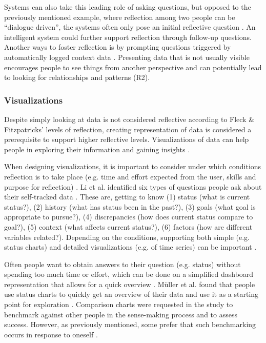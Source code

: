 Systems can also take this leading role of asking questions, but opposed to the previously mentioned example, where reflection among two people can be “dialogue driven”, the systems often only pose  an initial reflective question \cite{Mols}. An intelligent system could further support reflection through follow-up questions. Another ways to foster reflection is by prompting questions triggered by automatically logged context data \cite{Fleck}. Presenting data that is not usually visible encourages people to see things from another perspective and can potentially lead to looking for relationships and patterns (R2). 

\subsubsection{Visualizations}
Despite simply looking at data is not considered reflective according to Fleck \& Fitzpatricks’ levels of reflection, creating representation of data is considered a prerequisite to support higher reflective levels. Visualizations of data can help people in exploring their information and gaining insights \cite{Li2010, Choe2014}. 

When designing visualizations, it is important to consider under which conditions reflection is to take place (e.g. time and effort expected from the user, skills and purpose for reflection) \cite{Cuttone, Muller}. Li et al. identified six types of questions people ask about their self-tracked data \cite{Li2011}. These are, getting to know (1) status (what is current status?), (2) history (what has status been in the past?), (3) goals (what goal is appropriate to pursue?), (4) discrepancies (how does current status compare to goal?), (5) context (what affects current status?), (6) factors (how are different variables related?). Depending on the conditions, supporting both simple (e.g. status charts) and detailed visualizations (e.g. of time series) can be important \cite{Muller, Cutone}.

Often people want to obtain answers to their question (e.g. status) without spending too much time or effort, which can be done on a simplified dashboard representation that allows for a quick overview \cite{Cutone}. Müller et al. found that people use status charts to quickly get an overview of their data and use it as a starting point for exploration \cite{Muller}. Comparison charts were requested in the study to benchmark against other people in the sense-making process and to assess success. However, as previously mentioned, some prefer that such benchmarking occurs in response to oneself \cite{Ancker2015}. 

